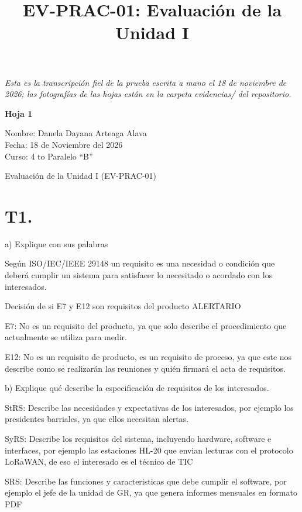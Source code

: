 \documentclass[conference,onecolumn]{IEEEtran}
\title{EV-PRAC-01: Evaluación de la Unidad I}
\author{\IEEEauthorblockN{Danela Dayana Arteaga Alava}\IEEEauthorblockA{Carrera de Software\\
Facultad de Ciencias de la Computación\\
Universidad Técnica Estatal de Quevedo, Ecuador\\
Ingeniería de Requerimientos -- ISR-401}}
\begin{document}
\maketitle

\noindent\emph{Esta es la transcripción fiel de la prueba escrita a mano el 18 de noviembre de 2026; las fotografías de las hojas están en la carpeta evidencias/ del repositorio.}

\bigskip

\noindent\textbf{Hoja 1}

\noindent Nombre: Danela Dayana Arteaga Alava\\
Fecha: 18 de Noviembre del 2026\\
Curso: 4 to Paralelo “B”

\begin{center}
Evaluación de la Unidad I (EV-PRAC-01)
\end{center}

\section*{T1.}

\noindent a) Explique con sus palabras

Según ISO/IEC/IEEE 29148 un requisito es una necesidad o condición que deberá cumplir un sistema para satisfacer lo necesitado o acordado con los interesados.

Decisión de si E7 y E12 son requisitos del producto ALERTARIO

\noindent E7: No es un requisito del producto, ya que solo describe el procedimiento que actualmente se utiliza para medir.

\noindent E12: No es un requisito de producto, es un requisito de proceso, ya que este nos describe como se realizarán las reuniones y quién firmará el acta de requisitos.

\medskip
\noindent b) Explique qué describe la especificación de requisitos de los interesados.

\noindent StRS: Describe las necesidades y expectativas de los interesados, por ejemplo los presidentes barriales, ya que ellos necesitan alertas.

\noindent SyRS: Describe los requisitos del sistema, incluyendo hardware, software e interfaces, por ejemplo las estaciones HL-20 que envian lecturas con el protocolo LoRaWAN, de eso el interesado es el técnico de TIC

\noindent SRS: Describe las funciones y caracteristicas que debe cumplir el software, por ejemplo el jefe de la unidad de GR, ya que genera informes mensuales en formato PDF
\end{document}
